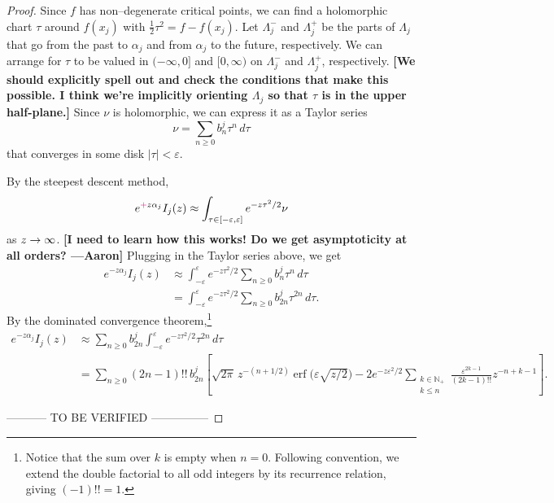 \documentclass{article}
\let\Re\relax
\DeclareMathOperator{\Re}{Re}
\theoremstyle{definition}
\begin{document}
\begin{proof}
Since $f$ has non--degenerate critical points, we can find a holomorphic chart $\tau$ around $f(x_j)$ with $\tfrac{1}{2} \tau^2 = f - f(x_j)$. Let $\Lambda^-_j$ and $\Lambda^+_j$ be the parts of $\Lambda_j$ that go from the past to $\alpha_j$ and from $\alpha_j$ to the future, respectively. We can arrange for $\tau$ to be valued in $(-\infty, 0]$ and $[0, \infty)$ on $\Lambda^-_j$ and $\Lambda^+_j$, respectively. \textbf{[We should explicitly spell out and check the conditions that make this possible. I think we're implicitly orienting $\Lambda_j$ so that $\tau$ is in the upper half-plane.]} Since $\nu$ is holomorphic, we can express it as a Taylor series
\[ \nu = \sum_{n \ge 0} b_n^j \tau^n\,d\tau \]
that converges in some disk $|\tau| < \varepsilon$.

By the steepest descent method,
\[ e^{\textcolor{magenta}{+}z \alpha_j} I_j(z) \approx \int_{\tau \in [-\varepsilon, \varepsilon]} e^{-z\tau^2/2} \nu \]
as $\Re z \to \infty$. 
\color{black}\textbf{[I need to learn how this works! Do we get asymptoticity at all orders? ---Aaron]} Plugging in the Taylor series above, we get
\begin{align*}
e^{-z \alpha_j} I_j(z) & \approx \int_{-\varepsilon}^\varepsilon e^{-z\tau^2/2} \sum_{n \ge 0} b_n^j \tau^n\,d\tau \\
& = \int_{-\varepsilon}^\varepsilon e^{-z\tau^2/2} \sum_{n \ge 0} b_{2n}^j \tau^{2n}\,d\tau.
\end{align*}
By the dominated convergence theorem,\footnote{Notice that the sum over $k$ is empty when $n = 0$. Following convention, we extend the double factorial to all odd integers by its recurrence relation, giving $(-1)!! = 1$.}
\begin{align*}
e^{-z \alpha_j} I_j(z) & \approx \sum_{n \ge 0} b_{2n}^j \int_{-\varepsilon}^\varepsilon e^{-z\tau^2/2} \tau^{2n}\,d\tau \\
& = \sum_{n \ge 0} (2n-1)!!\,b_{2n}^j \left[ \sqrt{2\pi}\,z^{-(n+1/2)} \operatorname{erf}\big(\varepsilon \sqrt{z/2}\big) - 2e^{-z\varepsilon^2/2} \sum_{\substack{k \in \mathbb{N}_+ \\ k \le n}} \frac{\varepsilon^{2k-1}}{(2k-1)!!} z^{-n+k-1} \right].
\end{align*}

----------- TO BE VERIFIED ---------------


\end{proof}
\end{document}
